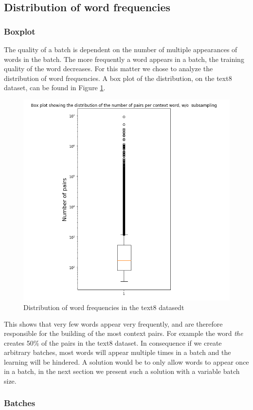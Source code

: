 \subsection{Distribution of word frequencies}
\subsubsection{Boxplot}
The quality of a batch is dependent on  the number of multiple appearances of words in the batch. The more frequently a word appears in a batch, the training quality of the word decreases. For this matter we chose to analyze the distribution of word frequencies. A box plot of the distribution, on the text8 dataset, can be found in Figure \ref{fig:boxplot_freq}. 
\begin{figure}[h]
\centering
\includegraphics[scale=0.3]{images/no_sampling_boxplot}
\caption{Distribution of word frequencies in the text8 datasedt}
\label{fig:boxplot_freq}
\end{figure} 
This shows that very few words appear very frequently, and are therefore responsible for the building of the most context pairs. For example the word \textit{the} creates 50\% of the pairs in the text8 dataset. In consequence if we create arbitrary batches, most words  will appear multiple times in a batch and the learning will be hindered. A solution would be to only allow words to appear once in a batch, in the next section we present such a solution with a variable batch size. \subsubsection{Batches}
